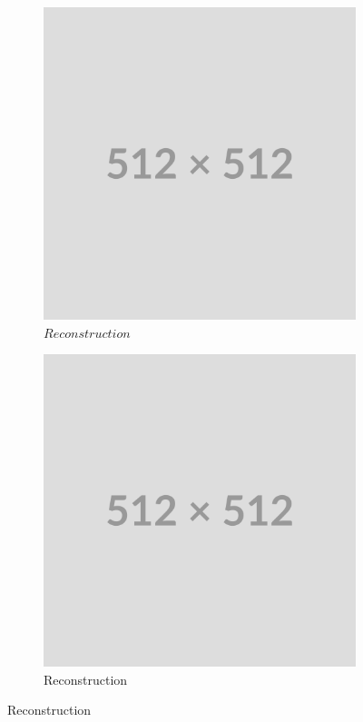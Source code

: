 \begin{figure}
    \centering
    \begin{subfigure}[b]{0.4\textwidth}
        \centering
        \includegraphics[width=\textwidth]{img/placeholder512.png}
        \caption{$Reconstruction$}
        \label{fig:rec-25-45}
    \end{subfigure}
    \hfill
    \begin{subfigure}[b]{0.4\textwidth}
        \centering
        \includegraphics[width=\textwidth]{img/placeholder512.png}
        \caption{Reconstruction}
        \label{fig:fft-25-45}
    \end{subfigure}
    

\end{figure}
